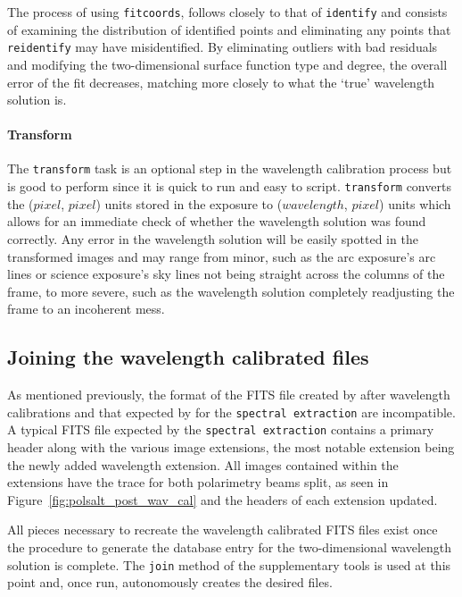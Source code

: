 The process of using \texttt{fitcoords}, follows closely to that of \texttt{identify} and consists of examining the distribution of identified points and eliminating any points that \texttt{reidentify} may have misidentified. By eliminating outliers with bad residuals and modifying the two-dimensional surface function type and degree, the overall error of the fit decreases, matching more closely to what the `true' wavelength solution is.

\paragraph{Transform}
The \texttt{transform} task is an optional step in the \iraf wavelength calibration process but is good to perform since it is quick to run and easy to script. \texttt{transform} converts the ($pixel$, $pixel$) units stored in the exposure to ($wavelength$, $pixel$) units which allows for an immediate check of whether the wavelength solution was found correctly. Any error in the wavelength solution will be easily spotted in the transformed images and may range from minor, such as the arc exposure's arc lines or science exposure's sky lines not being straight across the columns of the frame, to more severe, such as the wavelength solution completely readjusting the frame to an incoherent mess.



\subsection{Joining the wavelength calibrated files}

As mentioned previously, the format of the \gls{FITS} file created by \iraf after wavelength calibrations and that expected by \polsalt for the \texttt{spectral extraction} are incompatible. A typical \gls{FITS} file expected by the \polsalt \texttt{spectral extraction} contains a primary header along with the various image extensions, the most notable extension being the newly added wavelength extension. All images contained within the extensions have the trace for both polarimetry beams split, as seen in Figure~\ref{fig:polsalt_post_wav_cal} and the headers of each extension updated.
\prgph

All pieces necessary to recreate the \polsalt wavelength calibrated \gls{FITS} files exist once the \iraf procedure to generate the database entry for the two-dimensional wavelength solution is complete. The \texttt{join} method of the supplementary tools is used at this point and, once run, autonomously creates the desired files.
\prgph

